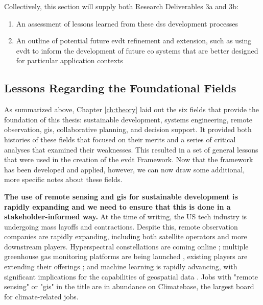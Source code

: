 Collectively, this section will supply both Research Deliverables 3a and 3b:

\begin{enumerate}[label=\emph{\alph*},itemsep=0pt,parsep=0pt]
	\item{An assessment of lessons learned from these \ac{dss} development processes} 
	\item{An outline of potential future \ac{evdt} refinement and extension, such as using \ac{evdt} to inform the development of future \ac{eo} systems that are better designed for particular application contexts} 
\end{enumerate}





\subsection{Lessons Regarding the Foundational Fields} \label{sec:lessons-foundational}

As summarized above, Chapter \ref{ch:theory} laid out the six fields that provide the foundation of this thesis: sustainable development, systems engineering, remote observation, \ac{gis}, collaborative planning, and decision support. It provided both histories of these fields that focused on their merits and a series of critical analyses that examined their weaknesses. This resulted in a set of general lessons that were used in the creation of the \ac{evdt} Framework. Now that the framework has been developed and applied, however, we can now draw some additional, more specific notes about these fields.   

\textbf{The use of remote sensing and \ac{gis} for sustainable development is rapidly expanding and we need to ensure that this is done in a stakeholder-informed way.} At the time of writing, the US tech industry is undergoing mass layoffs and contractions. Despite this, remote observation companies are rapidly expanding, including both satellite operators and more downstream players. Hyperspectral constellations are coming online \cite{planetlabspbcPlanetAnnouncesNew2022, rainbowPixxelRaises252022}; multiple greenhouse gas monitoring platforms are being launched \cite{clarkExclusiveSatelliteImages2022, brownSecurityCameraPlanet2023}, existing players are extending their offerings \cite{jewettPlanetDebutsPlanetary2022}; and machine learning is rapidly advancing, with significant implications for the capabilities of geospatial data \cite{joyceCanYouUse2023}. Jobs with "remote sensing" or "\ac{gis}" in the title are in abundance on Climatebase, the largest board for climate-related jobs. 

